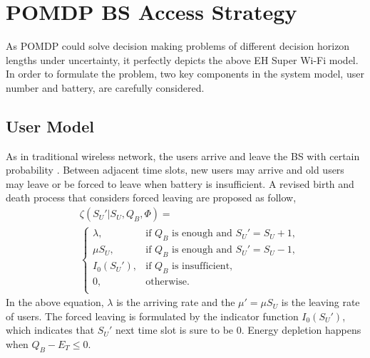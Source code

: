 \documentclass[conference]{IEEEtran}
\begin{document}
\section{POMDP BS Access Strategy}
As POMDP could solve decision making problems of different decision horizon lengths under uncertainty,
it perfectly depicts the above EH Super Wi-Fi model.
In order to formulate the problem, two key components in the system model, user number and battery, are carefully considered.
\subsection{User Model}
As in traditional wireless network, the users arrive and leave the BS with certain probability \cite{5}.
Between adjacent time slots, new users may arrive and
old users may leave or be forced to leave when battery is insufficient.
A revised birth and death process that considers forced leaving are proposed as follow,
\begin{align}\label{formula1}
&\zeta\left(S_U'| S_U, Q_B, \Phi\right) = \nonumber\\
&\begin{cases}
	\lambda, &\mbox{if $Q_B$ is enough and $S_U' = S_U + 1$,}\\
	\mu S_U, &\mbox{if $Q_B$ is enough and $S_U' = S_U - 1$,}\\
	I_0\left(S_U'\right), &\mbox{if $Q_B$ is insufficient,}\\
	0, &\mbox{otherwise.}\\
\end{cases}
\end{align}
In the above equation, \(\lambda\) is the arriving rate and
the \(\mu' = \mu S_U\) is the leaving rate of users.
The forced leaving is formulated by the indicator function \(I_0\left(S_U'\right)\),
which indicates that \(S_U'\) next time slot is sure to be \(0\).
Energy depletion happens when \(Q_B- E_T \leq 0\).
\end{document}
